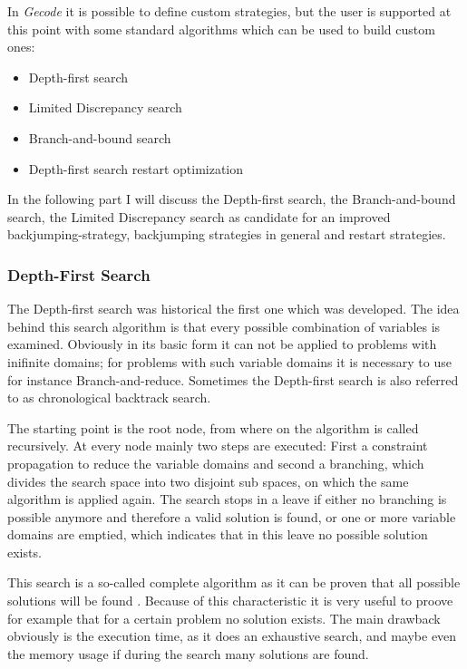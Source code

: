 \documentclass[10pt,
               a4paper,
               journal,
               ]{IEEEtran}
\begin{document}
	In \emph{Gecode} it is possible to define custom strategies, but the user is supported at this point with some standard algorithms which can be used to build custom ones:
	\begin{itemize}
		\item Depth-first search
		\item Limited Discrepancy search
		\item Branch-and-bound search
		\item Depth-first search restart optimization
	\end{itemize}
	
	In the following part I will discuss the Depth-first search, the Branch-and-bound search, the Limited Discrepancy search as candidate for an improved backjumping-strategy, backjumping strategies in general and restart strategies.
	
	\subsubsection{Depth-First Search}
	The Depth-first search was historical the first one which was developed. The idea behind this search algorithm is that every possible combination of variables is examined. Obviously in its basic form it can not be applied to problems with inifinite domains; for problems with such variable domains it is necessary to use for instance Branch-and-reduce. Sometimes the Depth-first search is also referred to as chronological backtrack search.
	
	The starting point is the root node, from where on the algorithm is called recursively. At every node mainly two steps are executed: First a constraint propagation to reduce the variable domains and second a branching, which divides the search space into two disjoint sub spaces, on which the same algorithm is applied again. The search stops in a leave if either no branching is possible anymore and therefore a valid solution is found, or one or more variable domains are emptied, which indicates that in this leave no possible solution exists.
	
	This search is a so-called complete algorithm as it can be proven that all possible solutions will be found \cite[p.~85]{handbookCP}. Because of this characteristic it is very useful to proove for example that for a certain problem no solution exists. The main drawback obviously is the execution time, as it does an exhaustive search, and maybe even the memory usage if during the search many solutions are found.
	
\end{document}
